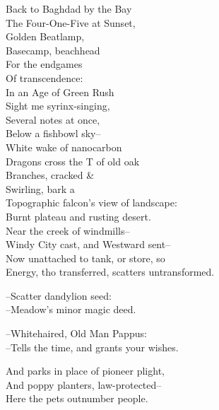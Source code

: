 Back to Baghdad by the Bay \\
The Four-One-Five at Sunset, \\
Golden Beatlamp, \\
Basecamp, beachhead \\
For the endgames \\
Of transcendence: \\
In an Age of Green Rush \\
Sight me syrinx-singing, \\
Several notes at once, \\
Below a fishbowl sky-- \\
White wake of nanocarbon \\
Dragons cross the T of old oak \\
Branches, cracked \& \\
Swirling, bark a \\
Topographic falcon's view of landscape: \\
Burnt plateau and rusting desert. \\
Near the creek of windmills-- \\
Windy City cast, and Westward sent-- \\
Now unattached to tank, or store, so \\
Energy, tho transferred, scatters untransformed.

--Scatter dandylion seed: \\
--Meadow's minor magic deed.

--Whitehaired, Old Man Pappus: \\
--Tells the time, and grants your wishes.

And parks in place of pioneer plight, \\
And poppy planters, law-protected-- \\
Here the pets outnumber people.